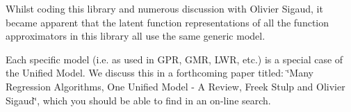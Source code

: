 Whilst coding this library and numerous discussion with Olivier Sigaud, it became apparent that the latent function representations of all the function approximators in this library all use the same generic model.

Each specific model (i.\+e. as used in G\+P\+R, G\+M\+R, L\+W\+R, etc.) is a special case of the Unified Model. We discuss this in a forthcoming paper titled\+: \char`\"{}\+Many Regression Algorithms, One Unified Model -\/ A Review, Freek Stulp and Olivier Sigaud\char`\"{}, which you should be able to find in an on-\/line search. 